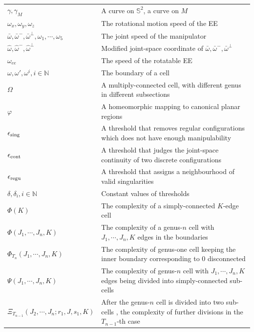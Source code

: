 \documentclass[Afour,sageh,times]{sagej}
\begin{document}
\begin{table}[h]
\begin{tabular}{>{\bfseries}ll}
$\gamma, \gamma_M$ & A curve on $\mathbb{S}^2$, a curve on $M$\\
$\omega_x, \omega_y, \omega_z$ & The rotational motion speed of the EE\\
$\bar{\omega}, \bar{\omega}^-, \bar{\omega}^\perp,  \omega_1, \cdots, \omega_5$ & The joint speed of the manipulator\\
$\hat{\omega}, \hat{\omega}^-, \hat{\omega}^\perp$ & Modified joint-space coordinate of $\bar{\omega}, \bar{\omega}^-, \bar{\omega}^\perp$\\
$\omega_{ee}$ & The speed of the rotatable EE\\
$\omega, \omega', \omega^i, i\in \mathbb{N}$ & The boundary of a cell\\
$\Omega$ & A multiply-connected cell, with different genus in different subsections\\
$\varphi$ & A homeomorphic mapping to canonical planar regions\\
$\epsilon_{\rm sing}$ & A threshold that removes regular configurations which does not have enough manipulability\\
$\epsilon_{\rm cont}$ & A threshold that judges the joint-space continuity of two discrete configurations\\
$\epsilon_{\rm regu}$ & A threshold that assigns a neighbourhood of valid singularities\\
$\delta, \delta_i, i\in \mathbb{N}$ & Constant values of thresholds\\
$\Phi(K)$ & The complexity of a simply-connected $K$-edge cell\\
$\Phi(J_1, \cdots, J_n, K)$ & The complexity of a genus-$n$ cell with $J_1, \cdots, J_n, K$ edges in the boundaries\\
$\Phi_{T_n}(J_1, \cdots, J_n, K)$ & The complexity of genus-one cell keeping the inner boundary corresponding to $0$ disconnected\\
$\Psi(J_1, \cdots, J_n, K)$ & The complexity of genus-$n$ cell with $J_1, \cdots, J_n, K$ edges being divided into simply-connected sub-cells\\
$\Xi_{T_{n-1}}(J_2, \cdots, J_n; r_1, J, s_1, K)$ & After the genus-$n$ cell is divided into two sub-cells , the complexity of further divisions in the $T_{n-1}$-th case\\
\bottomrule
\end{tabular}
\end{table}
\end{document}
